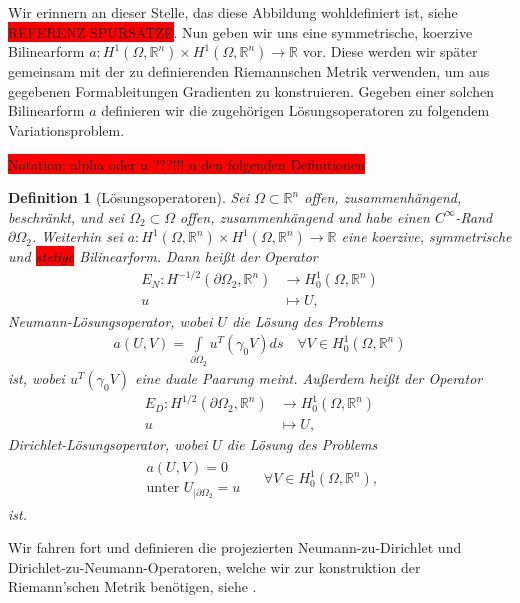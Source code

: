 \documentclass[bibliography=totoc,12pt,a4paper]{scrartcl}
\theoremstyle{exampstyle}
\newtheorem{defi}{Definition}%
\numberwithin{equation}{section}
\begin{document}
Wir erinnern an dieser Stelle, das diese Abbildung wohldefiniert ist, siehe \colorbox{red}{REFERENZ SPURSÄTZE}. Nun geben wir uns eine symmetrische, koerzive Bilinearform $a: H^1(\Omega, \mathbb{R}^n)\times H^1(\Omega, \mathbb{R}^n) \rightarrow \mathbb{R}$ vor. Diese werden wir später gemeinsam mit der zu definierenden Riemannschen Metrik verwenden, um aus gegebenen Formableitungen Gradienten zu konstruieren. Gegeben einer solchen Bilinearform $a$ definieren wir die zugehörigen Lösungsoperatoren zu folgendem Variationsproblem.

\colorbox{red}{Notation: alpha oder u ???!!! n den folgenden Definitionen}

\begin{defi}[Lösungsoperatoren]\label{Llsgsoperatoren}
Sei $\Omega\subset\mathbb{R}^n$ offen, zusammenhängend, beschränkt, und sei $\Omega_2\subset \Omega$ offen, zusammenhängend und habe einen $C^\infty$-Rand $\partial\Omega_2$.
Weiterhin sei $a: H^1(\Omega, \mathbb{R}^n)\times H^1(\Omega, \mathbb{R}^n) \rightarrow \mathbb{R}$ eine koerzive, symmetrische und \colorbox{red}{stetige}  Bilinearform. Dann heißt der Operator 
\begin{align*}
	E_N: H^{-1/2}(\partial\Omega_2, \mathbb{R}^n) &\rightarrow H^{1}_0(\Omega, \mathbb{R}^n) \\
	u &\mapsto U,
\end{align*}
\textit{Neumann-Lösungsoperator}, wobei $U$ die Lösung des Problems
\begin{align*}
	a(U,V) = \underset{\partial\Omega_2}{\int}u^T(\gamma_0 V)ds \quad \forall V \in H^1_0(\Omega,\mathbb{R}^n)
\end{align*}
ist, wobei $u^T(\gamma_0 V)$ eine duale Paarung meint. Außerdem heißt der Operator
\begin{align*}
	E_D: H^{1/2}(\partial\Omega_2, \mathbb{R}^n) &\rightarrow H^{1}_0(\Omega, \mathbb{R}^n) \\
	u &\mapsto U,
\end{align*}
\textit{Dirichlet-Lösungsoperator}, wobei $U$ die Lösung des Problems
\begin{align*}
	\begin{matrix} a(U,V) = 0 \\
	\text{unter } U_{\vert \partial\Omega_2} = u 
	\end{matrix} \quad\; \forall V \in H^1_0(\Omega,\mathbb{R}^n),
\end{align*}
ist.
\end{defi}

Wir fahren fort und definieren die projezierten Neumann-zu-Dirichlet und Dirichlet-zu-Neumann-Operatoren, welche wir zur konstruktion der Riemann'schen Metrik benötigen, siehe \cite{bfgs1}.
\end{document}
